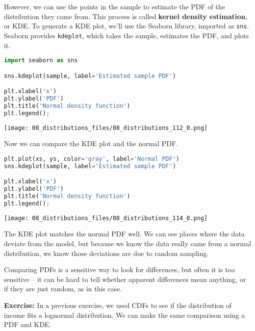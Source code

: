 However, we can use the points in the sample to estimate the PDF of the
distribution they came from. This process is called \textbf{kernel
density estimation}, or KDE. To generate a KDE plot, we'll use the
Seaborn library, imported as \passthrough{\lstinline!sns!}. Seaborn
provides \passthrough{\lstinline!kdeplot!}, which takes the sample,
estimates the PDF, and plots it.

\begin{lstlisting}[language=Python,style=source]
import seaborn as sns

sns.kdeplot(sample, label='Estimated sample PDF')

plt.xlabel('x')
plt.ylabel('PDF')
plt.title('Normal density function')
plt.legend();
\end{lstlisting}

\begin{center}
\texttt{[image: 08\_distributions\_files/08\_distributions\_112\_0.png]}
\end{center}

Now we can compare the KDE plot and the normal PDF.

\begin{lstlisting}[language=Python,style=source]
plt.plot(xs, ys, color='gray', label='Normal PDF')
sns.kdeplot(sample, label='Estimated sample PDF')

plt.xlabel('x')
plt.ylabel('PDF')
plt.title('Normal density function')
plt.legend();
\end{lstlisting}

\begin{center}
\texttt{[image: 08\_distributions\_files/08\_distributions\_114\_0.png]}
\end{center}

The KDE plot matches the normal PDF well. We can see places where the
data deviate from the model, but because we know the data really came
from a normal distribution, we know those deviations are due to random
sampling.

Comparing PDFs is a sensitive way to look for differences, but often it
is too sensitive -- it can be hard to tell whether apparent differences
mean anything, or if they are just random, as in this case.

\textbf{Exercise:} In a previous exercise, we used CDFs to see if the
distribution of income fits a lognormal distribution. We can make the
same comparison using a PDF and KDE.

